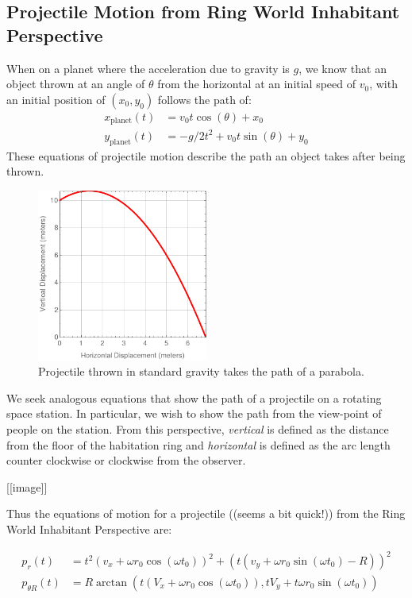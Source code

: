 \documentclass{amsart}
\theoremstyle{definition}
\begin{document}
\subsection{Projectile Motion from Ring World Inhabitant Perspective}


When on a planet where the acceleration due to gravity is $g$, we know
that an object thrown at an angle of $\theta$ from the horizontal at
an initial speed of $v_0$, with an initial position of $(x_0,y_0)$
follows the path of:
\begin{align*}
  x_{\mathrm{planet}}(t) &=  v_0 t \cos(\theta)  + x_0\\
  y_{\mathrm{planet}}(t) &=  -g/2 t^2 + v_0 t \sin(\theta)  + y_0
\end{align*}
These equations of projectile motion describe the path an object takes
after being thrown.

\begin{figure}[h]
  \centering
  \includegraphics[width=0.5\textwidth]{Projectile_In_Gravity.png}
  \caption{Projectile thrown in standard gravity takes the path of a parabola.}
  \label{fig:Braun Wheel}
\end{figure}

We seek analogous equations that show the path of a projectile on a
rotating space station. In particular, we wish to show the path from
the view-point of people on the station.  From this perspective,
\textit{vertical} is defined as the distance from the floor of the
habitation ring and \textit{horizontal} is defined as the arc length
counter clockwise or clockwise from the observer.

[[image]]


Thus the equations of motion for a projectile ((seems a bit quick!))
from the Ring World Inhabitant Perspective are:

\begin{align*}
  p_{r}(t) &= t^2 (v_x + \omega r_0 \cos(\omega t_0))^2 + (t(v_y + \omega
  r_0 \sin(\omega t_0) - R))^2\\
  p_{\theta R}(t) &=R \arctan(t(V_x + \omega r_0 \cos(\omega t_0)),tV_y +
                    t \omega r_0 \sin(\omega t_0))
\end{align*}
\end{document}
